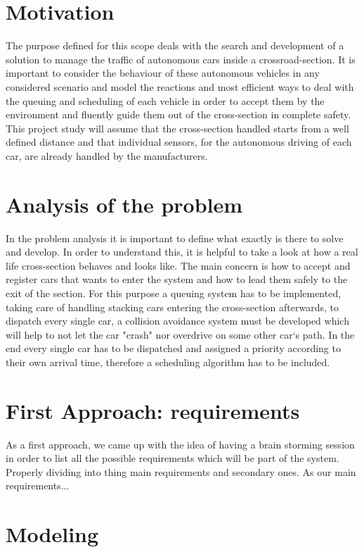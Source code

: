 \documentclass[conference]{IEEEtran}
\begin{document}
\section{Motivation}
The purpose defined for this scope deals with the search and development of a solution to manage the traffic of autonomous cars inside a crossroad-section. It is important to consider the behaviour of these autonomous vehicles in any considered scenario and model the reactions and most efficient ways to deal with the queuing and scheduling of each vehicle in order to accept them by the environment and fluently guide them out of the cross-section in complete safety. This project study will assume that the cross-section handled starts from a well defined distance and that individual sensors, for the autonomous driving of each car, are already handled by the manufacturers. 

\section{Analysis of the problem}
In the problem analysis it is important to define what exactly is there to solve and develop. In order to understand this, it is helpful to take a look at how a real life cross-section behaves and looks like. The main concern is how to accept and register cars that wants to enter the system and how to lead them safely to the exit of the section. For this purpose a queuing system has to be implemented, taking care of handling stacking cars entering the cross-section afterwards, to dispatch every single car, a collision avoidance system must be developed which will help to not let the car "crash" nor overdrive on some other car`s path. In the end every single car has to be dispatched and assigned a priority according to their own arrival time, therefore a scheduling algorithm has to be included.

\section{First Approach: requirements}
As a first approach, we came up with the idea of having a brain storming session in order to list all the possible requirements which will be part of the system. Properly dividing into thing main requirements and secondary ones. As our main requirements...

\section{Modeling}
\end{document}
